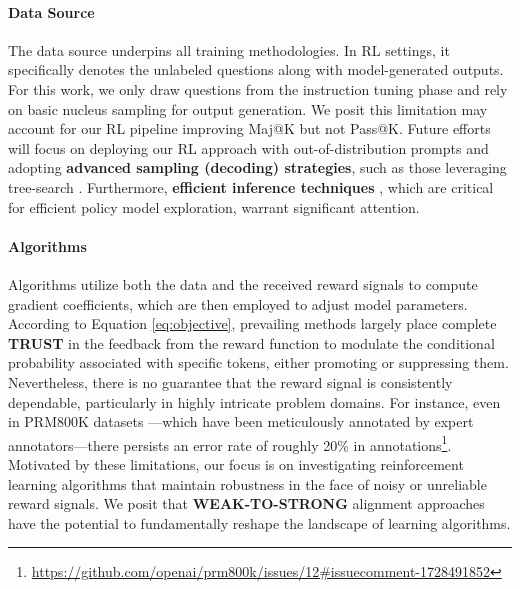 {\paragraph{Data Source} The data source underpins all training methodologies. In RL settings, it specifically denotes the unlabeled questions along with model-generated outputs. For this work, we only draw questions from the instruction tuning phase and rely on basic nucleus sampling for output generation. We posit this limitation may account for our RL pipeline improving Maj@K but not Pass@K. Future efforts will focus on deploying our RL approach with out-of-distribution prompts and adopting \textbf{advanced sampling (decoding) strategies}, such as those leveraging tree-search \citep{yao2023tree}. Furthermore, \textbf{efficient inference techniques} \citep{xia-etal-2023-speculative,leviathan2023fast,kwon2023efficient,xia2024unlocking}, which are critical for efficient policy model exploration, warrant significant attention.

\paragraph{Algorithms} Algorithms utilize both the data and the received reward signals to compute gradient coefficients, which are then employed to adjust model parameters. According to Equation \ref{eq:objective}, prevailing methods largely place complete \textbf{TRUST} in the feedback from the reward function to modulate the conditional probability associated with specific tokens, either promoting or suppressing them. Nevertheless, there is no guarantee that the reward signal is consistently dependable, particularly in highly intricate problem domains. For instance, even in PRM800K datasets \citep{lightman2023let}—which have been meticulously annotated by expert annotators—there persists an error rate of roughly 20\% in annotations\footnote{\url{https://github.com/openai/prm800k/issues/12\#issuecomment-1728491852}}. Motivated by these limitations, our focus is on investigating reinforcement learning algorithms that maintain robustness in the face of noisy or unreliable reward signals. We posit that \textbf{WEAK-TO-STRONG} alignment approaches \citep{burns2023weak} have the potential to fundamentally reshape the landscape of learning algorithms.

}
